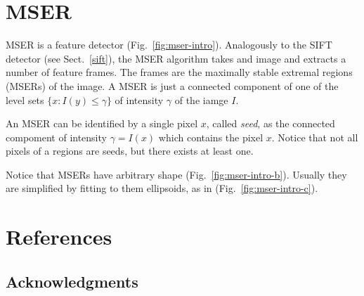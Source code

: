 \documentclass{article}
\begin{document}
\section{MSER}\label{mser}

MSER is a feature detector (Fig.~\ref{fig:mser-intro}). Analogously to
the SIFT detector (see Sect.~\ref{sift}), the MSER algorithm
takes and image and extracts a number of feature frames. The frames
are the maximally stable extremal regions (MSERs) of the image. A MSER
is just a connected component of one of the level sets $\{x:I(y)\leq
\gamma\}$ of intensity $\gamma$ of the iamge $I$.

\begin{figure*}[h]
\hfill
{}
\hfill
{}
\caption{{\em MSER: frames} \protect{}
  a test image, \protect{} detected MSERs (positive and negative), \protect{} MSERs as fitted ellipses.}
\label{fig:mser-intro}
\end{figure*}

An MSER can be identified by a single pixel $x$, called {\em seed}, as
the connected compoment of intensity $\gamma=I(x)$ which contains the
pixel $x$. Notice that not all pixels of a regions are seeds, but
there exists at least one.

Notice that MSERs have arbitrary shape
(Fig.~\ref{fig:mser-intro-b}). Usually they are simplified by fitting
to them ellipsoids, as in (Fig.~\ref{fig:mser-intro-c}).

\section*{References}

\subsection*{Acknowledgments}


\end{document}
